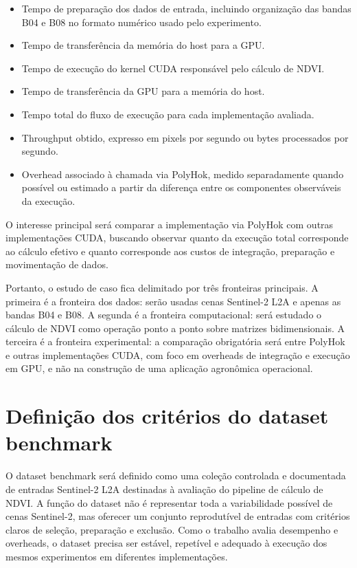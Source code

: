 \documentclass[tcc,capa]{texufpel}
\begin{document}
\begin{itemize}
  \item Tempo de preparação dos dados de entrada, incluindo organização das bandas B04 e B08 no formato numérico usado pelo experimento.
  \item Tempo de transferência da memória do host para a GPU.
  \item Tempo de execução do kernel CUDA responsável pelo cálculo de NDVI.
  \item Tempo de transferência da GPU para a memória do host.
  \item Tempo total do fluxo de execução para cada implementação avaliada.
  \item Throughput obtido, expresso em pixels por segundo ou bytes processados por segundo.
  \item Overhead associado à chamada via PolyHok, medido separadamente quando possível ou estimado a partir da diferença entre os componentes observáveis da execução.
\end{itemize}

O interesse principal será comparar a implementação via PolyHok com outras implementações CUDA, buscando observar quanto da execução total corresponde ao cálculo efetivo e quanto corresponde aos custos de integração, preparação e movimentação de dados.

Portanto, o estudo de caso fica delimitado por três fronteiras principais. A primeira é a fronteira dos dados: serão usadas cenas Sentinel-2 L2A e apenas as bandas B04 e B08. A segunda é a fronteira computacional: será estudado o cálculo de NDVI como operação ponto a ponto sobre matrizes bidimensionais. A terceira é a fronteira experimental: a comparação obrigatória será entre PolyHok e outras implementações CUDA, com foco em overheads de integração e execução em GPU, e não na construção de uma aplicação agronômica operacional.

\section{Definição dos critérios do dataset benchmark}

O dataset benchmark será definido como uma coleção controlada e documentada de entradas Sentinel-2 L2A destinadas à avaliação do pipeline de cálculo de NDVI. A função do dataset não é representar toda a variabilidade possível de cenas Sentinel-2, mas oferecer um conjunto reprodutível de entradas com critérios claros de seleção, preparação e exclusão. Como o trabalho avalia desempenho e overheads, o dataset precisa ser estável, repetível e adequado à execução dos mesmos experimentos em diferentes implementações.
\end{document}

